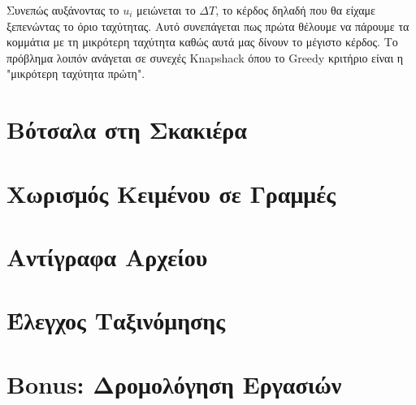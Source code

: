 \documentclass[a4paper,10pt]{article} \usepackage{anysize}
\begin{document}
Συνεπώς αυξάνοντας το $u_i$ μειώνεται το $\Delta{T}$, το κέρδος δηλαδή που θα
είχαμε ξεπενώντας το όριο ταχύτητας. Αυτό συνεπάγεται πως πρώτα θέλουμε να
πάρουμε τα κομμάτια με τη μικρότερη ταχύτητα καθώς αυτά μας δίνουν το μέγιστο
κέρδος. Το πρόβλημα λοιπόν ανάγεται σε συνεχές Knapshack όπου το Greedy
κριτήριο είναι η "μικρότερη ταχύτητα πρώτη".





\vspace{3cm}

\section{Βότσαλα στη Σκακιέρα}


\vspace{3cm}

\section{Χωρισμός Κειμένου σε Γραμμές}


\vspace{3cm}

\section{Αντίγραφα Αρχείου}


\vspace{3cm}

\section{Έλεγχος Ταξινόμησης}


\vspace{3cm}

\section{Bonus: Δρομολόγηση Εργασιών}
\end{document}
